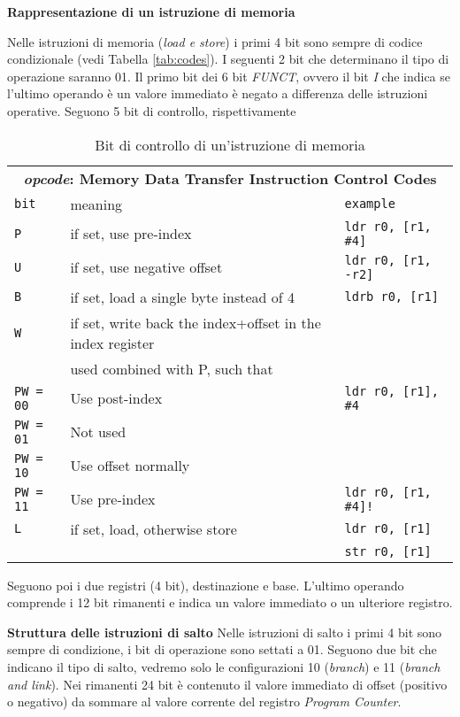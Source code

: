 \begin{defn}
    \textbf{Rappresentazione di un istruzione di memoria}

    Nelle istruzioni di memoria (\textit{load e store}) i primi 4 bit sono sempre di codice condizionale (vedi Tabella \ref{tab:codes}).
    I seguenti 2 bit che determinano il tipo di operazione saranno 01.
    Il primo bit dei 6 bit \textit{FUNCT}, ovvero il bit \textit{I} che indica se l'ultimo operando è un valore immediato è negato
    a differenza delle istruzioni operative.
    Seguono 5 bit di controllo, rispettivamente

    \def\opcode#1#2#3{\texttt{#1} & \small #2 & \texttt{#3}\\}
    \begin{table}[htbp]
        \centering
        \label{tab:pubwl}
        \caption{Bit di controllo di un'istruzione di memoria}
        \begin{tabular}{l@{\hspace{5mm}}ll}
            \multicolumn{3}{c}{\bfseries \emph{opcode}: Memory Data Transfer Instruction Control Codes} \\
            \opcode{bit}{meaning}{example}
            \hline
            \opcode{P}{if set, use pre-index}{ldr r0, [r1, \#4]}
            \opcode{U}{if set, use negative offset}{ldr r0, [r1, -r2]}
            \opcode{B}{if set, load a single byte instead of 4}{ldrb r0, [r1]}
            \opcode{W}{if set, write back the index+offset in the index register}{}
            \opcode{}{used combined with P, such that}{}
            \opcode{PW = 00}{Use post-index}{ldr r0, [r1], \#4}
            \opcode{PW = 01}{Not used}{}
            \opcode{PW = 10}{Use offset normally}{}
            \opcode{PW = 11}{Use pre-index}{ldr r0, [r1, \#4]!}
            \opcode{L}{if set, load, otherwise store}{ldr r0, [r1]}
            \opcode{}{}{str r0, [r1]}
        \end{tabular}
    \end{table}

    Seguono poi i due registri (4 bit), destinazione e base.
    L'ultimo operando comprende i 12 bit rimanenti e indica un valore immediato o un ulteriore registro.
\end{defn}

\begin{defn}
    \textbf{Struttura delle istruzioni di salto}
    Nelle istruzioni di salto i primi 4 bit sono sempre di condizione, i bit di operazione sono settati a 01.
    Seguono due bit che indicano il tipo di salto, vedremo solo le configurazioni 10 (\textit{branch}) e 11 (\textit{branch and link}).
    Nei rimanenti 24 bit è contenuto il valore immediato di offset (positivo o negativo) da sommare al valore corrente del registro \textit{Program Counter}.
\end{defn}

